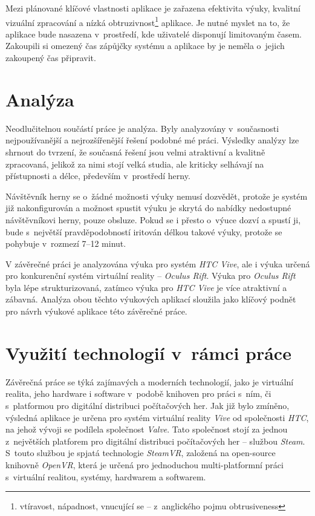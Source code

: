 \documentclass[12pt, a4paper]{article}
\begin{document}
Mezi plánované klíčové vlastnosti aplikace je zařazena efektivita výuky, kvalitní vizuální zpracování a nízká obtruzivnost\footnote{vtíravost, nápadnost, vnucující se -- z~anglického pojmu obtrusiveness} aplikace. Je nutné myslet na to, že aplikace bude nasazena v~prostředí, kde uživatelé disponují limitovaným časem. Zakoupili si omezený čas zápůjčky systému a aplikace by je neměla o~jejich zakoupený čas připravit.

\newpage

\section{Analýza}

Neodlučitelnou součástí práce je analýza. Byly analyzovány v~současnosti nejpoužívanější a nejrozšířenější řešení podobné mé práci. Výsledky analýzy lze shrnout do tvrzení, že současná řešení jsou velmi atraktivní a kvalitně zpracovaná, jelikož za nimi stojí velká studia, ale kriticky selhávají na přístupnosti a délce, především v~prostředí herny.

Návštěvník herny se o~žádné možnosti výuky nemusí dozvědět, protože je systém již nakonfigurován a možnost spustit výuku je skrytá do nabídky nedostupné návštěvníkovi herny, pouze obsluze. Pokud se i přesto o~výuce dozví a spustí ji, bude s~největší pravděpodobností iritován délkou takové výuky, protože se pohybuje v~rozmezí 7--12 minut.

V závěrečné práci je analyzována výuka pro systém \textit{HTC Vive}, ale i výuka určená pro konkurenční systém virtuální reality -- \textit{Oculus Rift}. Výuka pro \textit{Oculus Rift} byla lépe strukturizovaná, zatímco výuka pro \textit{HTC Vive} je více atraktivní a zábavná. Analýza obou těchto výukových aplikací sloužila jako klíčový podnět pro návrh výukové aplikace této závěrečné práce.

\section{Využití technologií v~rámci práce}

Závěrečná práce se týká zajímavých a moderních technologií, jako je virtuální realita, jeho hardware i software v~podobě knihoven pro práci s~ním, či s~platformou pro digitální distribuci počítačových her. Jak již bylo zmíněno, výsledná aplikace je určena pro systém virtuální reality \textit{Vive} od společnosti \textit{HTC}, na jehož vývoji se podílela společnost \textit{Valve}. Tato společnost stojí za jednou z~největších platforem pro digitální distribuci počítačových her -- službou \textit{Steam}. S~touto službou je spjatá technologie \textit{SteamVR}, založená na open-source knihovně \textit{OpenVR}, která je určená pro jednoduchou multi-platformní práci s~virtuální realitou, systémy, hardwarem a softwarem.\cite{openvr}
\end{document}
